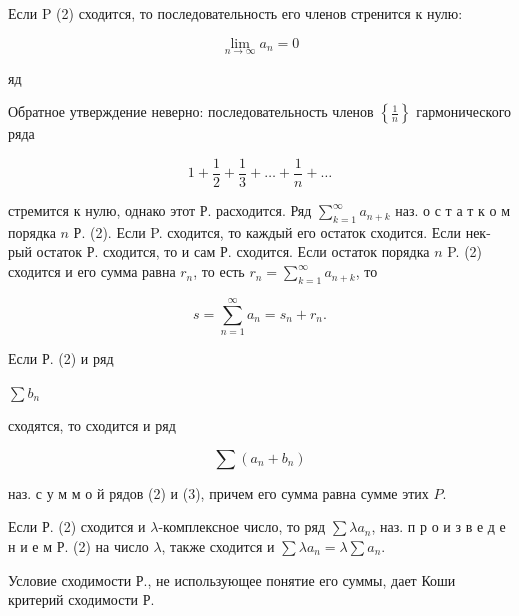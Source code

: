 \documentclass[10pt]{article}
\begin{document}
Если P (2) сходится, то последовательность его членов стренится к нулю:



\[

\lim _{n \rightarrow \infty} a_{n}=0

\]



яд



Обратное утверждение неверно: последовательность членов $\left\{\frac{1}{n}\right\}$ гармонического ряда



\[

1+\frac{1}{2}+\frac{1}{3}+\ldots+\frac{1}{n}+\ldots

\]



стремится к нулю, однако этот Р. расходится. Ряд $\sum_{k=1}^{\infty} a_{n+k}$ наз. о с т а т к о м порядка $n$ Р. (2). Если P. сходится, то каждый его остаток сходится. Если нек-рый остаток Р. сходится, то и сам Р. сходится. Если остаток порядка $n$ P. (2) сходится и его сумма равна $r_{n}$, то есть $r_{n}=\sum_{k=1}^{\infty} a_{n+k}$, то



\[

s=\sum_{n=1}^{\infty} a_{n}=s_{n}+r_{n} .

\]



Если Р. (2) и ряд



$\sum b_{n}$



сходятся, то сходится и ряд



\[

\sum\left(a_{n}+b_{n}\right)

\]



наз. с у м м о й рядов (2) и (3), причем его сумма равна сумме этих $P$.



Если Р. (2) сходится и $\lambda$-комплексное число, то ряд $\sum \lambda a_{n}$, наз. п р о и з в е д е н и е м Р. (2) на число $\lambda$, также сходится и $\sum \lambda a_{n}=\lambda \sum a_{n}$.



Условие сходимости Р., не использующее понятие его суммы, дает Коши критерий сходимости Р.
\end{document}
